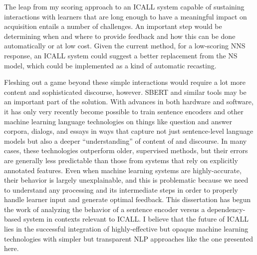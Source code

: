 The leap from my scoring approach to an ICALL system capable of sustaining interactions with learners that are long enough to have a meaningful impact on acquisition entails a number of challenges. An important step would be determining when and where to provide feedback and how this can be done automatically or at low cost. Given the current method, for a low-scoring NNS response, an ICALL system could suggest a better replacement from the NS model, which could be implemented as a kind of automatic recasting.

Fleshing out a game beyond these simple interactions would require a lot more content and sophisticated discourse, however. SBERT and similar tools may be an important part of the solution. With advances in both hardware and software, it has only very recently become possible to train sentence encoders and other machine learning language technologies on things like question and answer corpora, dialogs, and essays in ways that capture not just sentence-level language models but also a deeper ``understanding'' of content of and discourse. In many cases, these technologies outperform older, supervised methods, but their errors are generally less predictable than those from systems that rely on explicitly annotated features. Even when machine learning systems are highly-accurate, their behavior is largely unexplainable, and this is problematic because we need to understand any processing and its intermediate steps in order to properly handle learner input and generate optimal feedback. This dissertation has begun the work of analyzing the behavior of a sentence encoder versus a dependency-based system in contexts relevant to ICALL. I believe that the future of ICALL lies in the successful integration of highly-effective but opaque machine learning technologies with simpler but transparent NLP approaches like the one presented here. 

